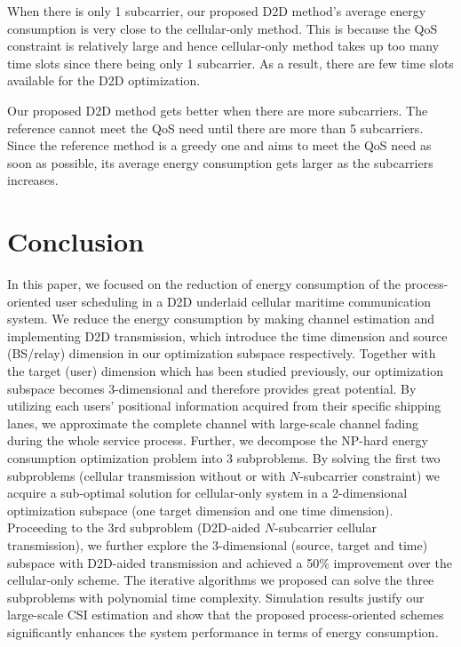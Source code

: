 \documentclass{ieeeaccess}
\begin{document}
When there is only 1 subcarrier, our proposed D2D method's average energy consumption is very close to the cellular-only method. This is because the QoS constraint is relatively large and hence cellular-only method takes up too many time slots since there being only 1 subcarrier. As a result, there are few time slots available for the D2D optimization.

Our proposed D2D method gets better when there are more subcarriers. The reference cannot meet the QoS need until there are more than 5 subcarriers. Since the reference method is a greedy one and aims to meet the QoS need as soon as possible, its average energy consumption gets larger as the subcarriers increases.


\section{Conclusion}\label{sec:4}

In this paper, we focused on the reduction of energy consumption of the process-oriented user scheduling in a D2D underlaid cellular maritime communication system. 
We reduce the energy consumption by making channel estimation and implementing D2D transmission, which introduce the time dimension and source (BS/relay) dimension in our optimization subspace respectively. Together with the target (user) dimension which has been studied previously, our optimization subspace becomes 3-dimensional and therefore provides great potential. 
By utilizing each users' positional information acquired from their specific shipping lanes, we approximate the complete channel with large-scale channel fading during the whole service process. Further, we decompose the NP-hard energy consumption optimization problem into 3 subproblems. By solving the first two subproblems (cellular transmission without or with $N$-subcarrier constraint) we acquire a sub-optimal solution for cellular-only system in a 2-dimensional optimization subspace (one target dimension and one time dimension). Proceeding to the 3rd subproblem (D2D-aided $N$-subcarrier cellular transmission), we further explore the 3-dimensional (source, target and time) subspace with D2D-aided transmission and achieved a 50\% improvement over the cellular-only scheme. The iterative algorithms we proposed can solve the three subproblems with polynomial time complexity. Simulation results justify our large-scale CSI estimation and show that the proposed process-oriented schemes significantly enhances the system performance in terms of energy consumption.
\end{document}
